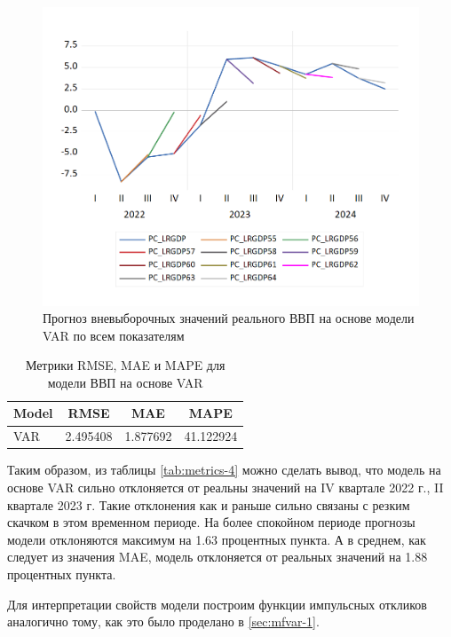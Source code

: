 \documentclass[a4paper, 14pt]{extreport}
\numberwithin{equation}{section}
\numberwithin{equation}{section}
\begin{document}
	\begin{figure}[h!]
		\centering
		\includegraphics[scale=0.7]{images/image48}
		\caption{Прогноз вневыборочных значений реального ВВП на основе  модели VAR по всем показателям}
		\label{fig:image48}
	\end{figure}
	
	\begin{table}[h!]
		\centering
		\caption{Метрики RMSE, MAE и MAPE для модели ВВП на основе VAR}
		\begin{tabular}{lccc}
			\toprule
			\textbf{Model} & \textbf{RMSE} & \textbf{MAE} & \textbf{MAPE} \\ 
			\midrule
			VAR & 2.495408 & 1.877692 & 41.122924 \\ 
			\bottomrule
		\end{tabular}
		\label{tab:model_metrics-2}
	\end{table}
	
	Таким образом, из таблицы \ref{tab:metrics-4} можно сделать вывод, что модель на основе VAR сильно отклоняется от реальны значений на IV квартале 2022 г., II квартале 2023 г. Такие отклонения как и раньше сильно связаны с резким скачком в этом временном периоде. На более спокойном периоде прогнозы модели отклоняются максимум на 1.63 процентных пункта. А в среднем, как следует из значения MAE, модель отклоняется от реальных значений на 1.88 процентных пункта.
	
	Для интерпретации свойств модели построим функции импульсных откликов аналогично тому, как это было проделано в \ref{sec:mfvar-1}. 
	
\end{document}
